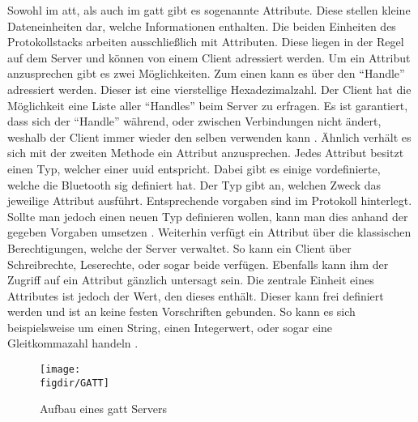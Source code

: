 \noindent Sowohl im \ac{att}, als auch im \ac{gatt} gibt es sogenannte Attribute. Diese stellen kleine Dateneinheiten dar, welche Informationen enthalten. Die beiden Einheiten des Protokollstacks arbeiten ausschließlich mit Attributen. Diese liegen in der Regel auf dem Server und können von einem Client adressiert werden. Um ein Attribut anzusprechen gibt es zwei Möglichkeiten. Zum einen kann es über den "`Handle"' adressiert werden. Dieser ist eine vierstellige Hexadezimalzahl. Der Client hat die Möglichkeit eine Liste aller "`Handles"' beim Server zu erfragen. Es ist garantiert, dass sich der "`Handle"' während, oder zwischen Verbindungen nicht ändert, weshalb der Client immer wieder den selben verwenden kann \cite[Seite 53f]{Townsend14:GSB}. Ähnlich verhält es sich mit der zweiten Methode ein Attribut anzusprechen. Jedes Attribut besitzt einen Typ, welcher einer \ac{uuid} entspricht. Dabei gibt es einige vordefinierte, welche die Bluetooth \ac{sig} definiert hat. Der Typ gibt an, welchen Zweck das jeweilige Attribut ausführt. Entsprechende vorgaben sind im Protokoll hinterlegt. Sollte man jedoch einen neuen Typ definieren wollen, kann man dies anhand der gegeben Vorgaben umsetzen \cite[Seite 31]{Usama17:BBS}. Weiterhin verfügt ein Attribut über die klassischen Berechtigungen, welche der Server verwaltet. So kann ein Client über Schreibrechte, Leserechte, oder sogar beide verfügen. Ebenfalls kann ihm der Zugriff auf ein Attribut gänzlich untersagt sein. Die zentrale Einheit eines Attributes ist jedoch der Wert, den dieses enthält. Dieser kann frei definiert werden und ist an keine festen Vorschriften gebunden. So kann es sich beispielsweise um einen String, einen Integerwert, oder sogar eine Gleitkommazahl handeln \cite[Seite 54ff]{Townsend14:GSB}.\\   

\begin{figure}[h]
	\centering
	\texttt{[image: \\figdir/GATT]}
	\caption{Aufbau eines \ac{gatt} Servers \cite[Seite 57]{Townsend14:GSB}}
	\label{FIG:gatt}
\end{figure}

